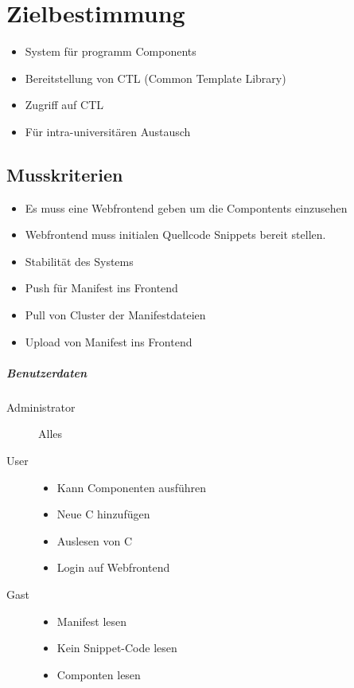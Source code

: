 
\chapter{Zielbestimmung}

\begin{itemize}
\item  System für programm Components
\item  Bereitstellung von CTL (Common Template Library)
\item  Zugriff auf CTL
\item  Für intra-universitären Austausch
\end{itemize}

\section{Musskriterien}

\begin{itemize}
\item  Es muss eine Webfrontend geben um die Compontents einzusehen
\item  Webfrontend muss initialen Quellcode Snippets bereit stellen.
\item  Stabilität des Systems
\item  Push für Manifest ins Frontend
\item  Pull von Cluster der Manifestdateien
\item  Upload von Manifest ins Frontend
\end{itemize}

\paragraph{Benutzerdaten}

\begin{description}
	\item[Administrator] Alles
	\item[User]
		\begin{itemize}
			\item Kann Componenten ausführen
			\item Neue C hinzufügen
			\item Auslesen von C
			\item Login auf Webfrontend
		\end{itemize}
	\item[Gast] 
		\begin{itemize}
			\item Manifest lesen
			\item Kein Snippet-Code lesen
			\item Componten lesen
		\end{itemize}
\end{description}

